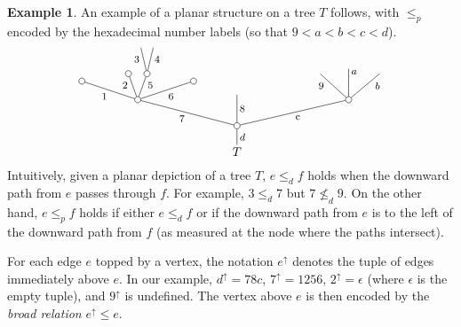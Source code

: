 \documentclass[a4paper,10pt
,draft
]{article}%
\numberwithin{equation}{section}
\numberwithin{figure}{section}
\theoremstyle{definition} %
\newtheorem{example}[equation]{Example}%
\newcommand{\1}{\ensuremath{\mathbbm 1}}%
\begin{document}
\begin{example}\label{PLANAREX EX}
An example of a planar structure on a tree $T$ follows, with $\leq_p$ encoded by the hexadecimal number labels
(so that $9<a<b<c<d$).
\[
	\begin{tikzpicture}[grow=up,auto,level distance=2.1em,
	every node/.style = {font=\footnotesize,inner sep=2pt},
	dummy/.style={circle,draw,inner sep=0pt,minimum size=1.75mm}]
		\node[font=\normalsize] at (0,0) {$T$}
			child{node [dummy] {}
				child[sibling distance = 9em]{node [dummy] {}
					child[sibling distance = 2.5em]{
					edge from parent node [near end,swap] {$b$}}
					child[level distance=2.5em]{
					edge from parent node [very near end,swap] {$a$}}				
					child[sibling distance = 2.3em]{
					edge from parent node [near end] {$9$}}
				edge from parent node [swap] {c}}
				child[level distance =2.5em]{
				edge from parent node [swap] {$8$}}
				child[sibling distance = 8em]{node [dummy] {}
					child[sibling distance =3em, level distance = 1.5 em]{node [dummy] {}
					edge from parent node [swap] {$6$}}
					child[sibling distance = 1.5em]{node [dummy] {}
						child[sibling distance =1em]{
						edge from parent node [swap,near end] {$4$}}
						child[sibling distance =1em]{
						edge from parent node [near end] {$3$}}
					edge from parent node [very near end,swap] {$5$}}
					child[sibling distance =1.5em]{node [dummy] {}
					edge from parent node [very near end] {$2$}}
					child[sibling distance =3em,level distance =1.5em]{node [dummy] {}
					edge from parent node {$1$}}
				edge from parent node {$7$}}
			edge from parent node [swap] {$d$}};
	\end{tikzpicture}
\]
Intuitively, given a planar depiction of a tree $T$, $e \leq_d f$ holds when the downward path from $e$ passes through $f$.
For example, $3 \leq_d 7$ but $7 \not \leq_d 9$.
On the other hand, $e \leq_p f$ holds if either
$e \leq_d f$ or if the downward path from $e$ is to the left of the downward path from $f$ (as measured at the node where the paths intersect).

For each edge $e$ topped by a vertex, the notation $e^{\uparrow}$ denotes the tuple of edges immediately above $e$.
In our example, 
$d^{\uparrow} = 78c$,
$7^{\uparrow} = 1256$,
$2^{\uparrow} = \epsilon$ 
(where $\epsilon$ is the empty tuple),
and $9^{\uparrow}$ is undefined.
The vertex above $e$ is then encoded by the \emph{broad relation}
$e^{\uparrow} \leq e$.


\end{example}
\end{document}
